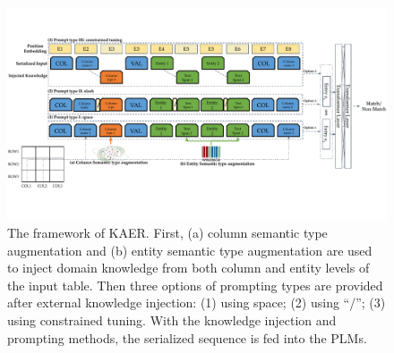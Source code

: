 \begin{figure}[!ht]
    \centering
    \includegraphics[width=\linewidth]{plots/DCER_short.pdf}
    \vspace{-0.7cm}
    \caption{The framework of KAER. First, (a) column semantic type augmentation and (b) entity semantic type augmentation are used to inject domain knowledge from both column and entity levels of the input table. 
    Then three options of prompting types are provided after external knowledge injection: (1) using space; (2) using ``/''; (3) using constrained tuning. 
    With the knowledge injection and prompting methods, the serialized sequence is fed into the PLMs.}
    \vspace{-0.5cm}
    \label{fig:framework}
\end{figure}



